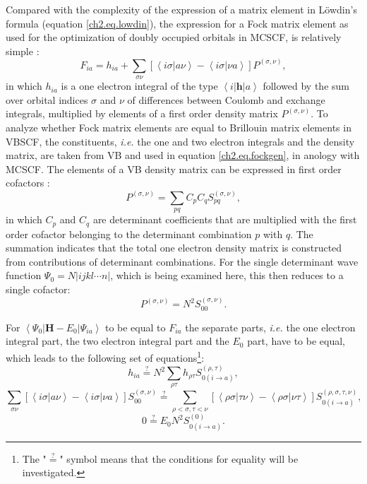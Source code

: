 Compared with the complexity of the expression of a matrix element in L\"{o}wdin's formula (equation \ref{ch2.eq.lowdin}), the expression for a Fock matrix element as used for the optimization of doubly occupied orbitals in MCSCF, is relatively simple \cite{roos1}:
\begin{equation}
F_{ia} = h_{ia} + \sum_{\sigma \nu} [ \left <i \sigma | a \nu \right > - \left < i \sigma | \nu a \right> ]P^{(\sigma,\nu)},
\label{ch2.eq.fockgen}
\end{equation}
in which $h_{ia}$ is a one electron integral of the type $\left < i | \mathbf{h} | a \right> $ followed by the sum over orbital indices $\sigma$ and $\nu$ of differences between Coulomb and exchange integrals, multiplied by elements of a first order density matrix $P^{(\sigma,\nu)}$. To analyze whether Fock matrix elements are equal to Brillouin matrix elements in VBSCF, the constituents, \textit{i.e.} the one and two electron integrals and the density matrix, are taken from VB and used in equation \ref{ch2.eq.fockgen}, in anology with MCSCF. The elements of a VB density matrix can be expressed in first order cofactors \cite{joopboek}:
\begin{equation}
P^{(\sigma,\nu)} = \sum_{pq}  C_p C_q S_{pq}^{(\sigma,\nu)},
\label{ch2.eq.densmat1}
\end{equation}
in which $C_p$ and $C_q$ are determinant coefficients that are multiplied with the first order cofactor belonging to the determinant combination $p$ with $q$.  The summation indicates that the total one electron density matrix is constructed from contributions of determinant combinations. For the single determinant wave function $\Psi_0 = N |ijkl \cdots n|$, which is being examined here, this then reduces to a single cofactor:
\begin{equation}
P^{(\sigma,\nu)} = N^2 S_{00}^{(\sigma,\nu)}.
\label{ch2.eq.densmat2}
\end{equation}
  
For $\left < \Psi_0 | \mathbf{H} - E_0 | \Psi_{ia} \right >$ to be equal to $F_{ia}$ the separate parts, \textit{i.e.} the one electron integral part, the two electron integral part and the $E_0$ part, have to be equal, which leads to the following set of equations\footnote{The "$\stackrel{?}{=}$" symbol means that the conditions for equality will be investigated.}:
\begin{equation}
h_{ia} \stackrel {?}{=} N^2 \sum_{\rho\tau} h_{\rho\tau} S_{0(i\rightarrow a)}^{(\rho,\tau)},
\label{ch2.eq.oneelpart}
\end{equation}
\begin{equation}
\sum_{\sigma \nu} [ \left <i \sigma | a \nu \right > - \left < i \sigma | \nu a \right> ]S_{00}^{(\sigma,\nu)} \stackrel {?}{=}  \sum_{\rho<\sigma,\tau<\nu} [\left <\rho\sigma|\tau\nu \right > - \left < \rho\sigma | \nu\tau \right> ]  S_{0(i\rightarrow a)}^{(\rho,\sigma,\tau,\nu)},
\label{ch2.eq.twoelpart}
\end{equation}
\begin{equation}
0 \stackrel {?}{=} E_0 N^2 S_{0(i\rightarrow a)}^{(0)}.
\label{ch2.eq.e0part}
\end{equation}

